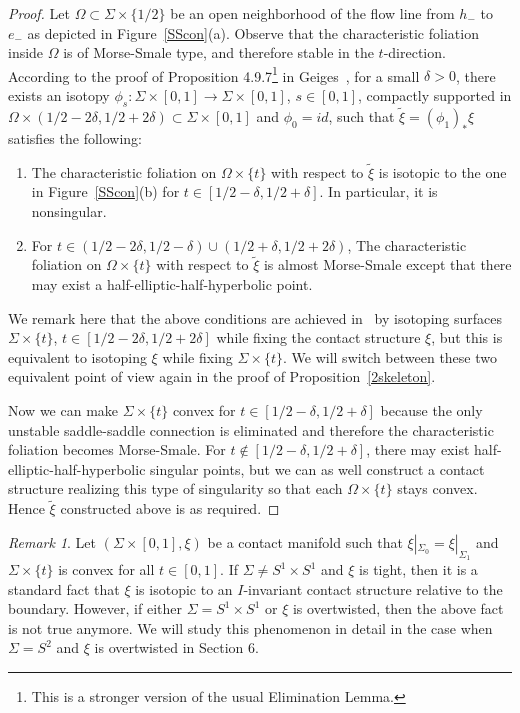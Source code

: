 \documentclass[12pt]{amsart}
\theoremstyle{remark}
\newtheorem{rmk}[thm]{Remark}
\newcommand{\be}{\begin{enumerate}}
\newcommand{\ee}{\end{enumerate}}
\begin{document}
\begin{proof}
Let $\Omega \subset \Sigma\times\{1/2\}$ be an open neighborhood of the flow line from $h_-$ to $e_-$ as depicted in Figure~\ref{SScon}(a). Observe that the characteristic foliation inside $\Omega$ is of Morse-Smale type, and therefore stable in the $t$-direction. According to the proof of Proposition 4.9.7\footnote{This is a stronger version of the usual Elimination Lemma.} in Geiges~\cite{Ge}, for a small $\delta>0$, there exists an isotopy $\phi_s:\Sigma\times[0,1] \to \Sigma\times[0,1]$, $s \in [0,1]$, compactly supported in $\Omega\times(1/2-2\delta,1/2+2\delta) \subset \Sigma\times[0,1]$ and $\phi_0=id$, such that $\tilde\xi=(\phi_1)_*\xi$ satisfies the following:

\be

\item{The characteristic foliation on $\Omega\times\{t\}$ with respect to $\tilde\xi$ is isotopic to the one in Figure~\ref{SScon}(b) for $t\in[1/2-\delta,1/2+\delta]$. In particular, it is nonsingular.}

\item{For $t\in(1/2-2\delta,1/2-\delta)\cup(1/2+\delta,1/2+2\delta)$, The characteristic foliation on $\Omega\times\{t\}$ with respect to $\tilde\xi$ is almost Morse-Smale except that there may exist a half-elliptic-half-hyperbolic point.}

\ee
We remark here that the above conditions are achieved in~\cite{Ge} by isotoping surfaces $\Sigma\times\{t\}$, $t\in[1/2-2\delta,1/2+2\delta]$ while fixing the contact structure $\xi$, but this is equivalent to isotoping $\xi$ while fixing $\Sigma\times\{t\}$. We will switch between these two equivalent point of view again in the proof of Proposition~\ref{2skeleton}.

Now we can make $\Sigma\times\{t\}$ convex for $t\in[1/2-\delta,1/2+\delta]$ because the only unstable saddle-saddle connection is eliminated and therefore the characteristic foliation becomes Morse-Smale. For $t\notin[1/2-\delta,1/2+\delta]$, there may exist half-elliptic-half-hyperbolic singular points, but we can as well construct a contact structure realizing this type of singularity so that each $\Omega\times\{t\}$ stays convex. Hence $\tilde\xi$ constructed above is as required.
\end{proof}

\begin{rmk}
Let $(\Sigma\times[0,1],\xi)$ be a contact manifold such that $\xi|_{\Sigma_0}=\xi|_{\Sigma_1}$ and $\Sigma\times\{t\}$ is convex for all $t\in[0,1]$. If $\Sigma\neq S^1\times S^1$ and $\xi$ is tight, then it is a standard fact that $\xi$ is isotopic to an $I$-invariant contact structure relative to the boundary. However, if either $\Sigma=S^1\times S^1$ or $\xi$ is overtwisted, then the above fact is not true anymore. We will study this phenomenon in detail in the case when $\Sigma=S^2$ and $\xi$ is overtwisted in Section 6.
\end{rmk}
\end{document}
